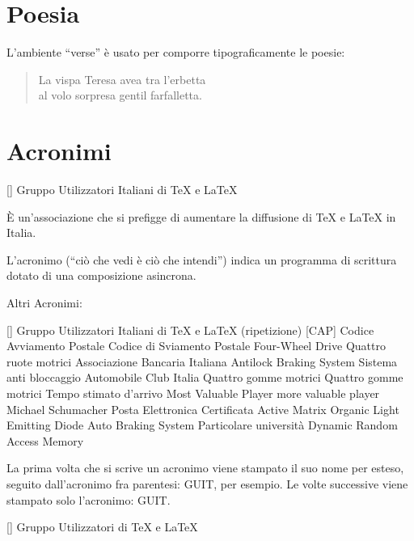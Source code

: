 \documentclass[a4paper,12pt]{article} %
\begin{document}
\section{Poesia} %
L'ambiente ``verse'' è usato per comporre tipograficamente le poesie:
\begin{verse}
	La vispa Teresa avea tra l'erbetta\\ %
	al volo sorpresa gentil farfalletta.
\end{verse}

\section{Acronimi}
\begin{acronym}   
	 [\GuIT] {Gruppo Utilizzatori Italiani di TeX e LaTeX}
	
	{\small È un’associazione che si prefigge di aumentare la diffusione di
		\TeX{} e \LaTeX{} in Italia.\par}
	{\small L’acronimo (“ciò che vedi è ciò che intendi”) indica un
		programma di scrittura dotato di una composizione asincrona.\par}
\end{acronym}
Altri Acronimi:
\begin{acronym}  
	 [\GuIT] {Gruppo Utilizzatori Italiani di TeX e LaTeX} (ripetizione)	
	 [CAP] {Codice Avviamento Postale}
	 {Codice di Sviamento Postale}
	 {Four-Wheel Drive} 
	 {Quattro ruote motrici} 
	 {Associazione Bancaria Italiana} 
	 {Antilock Braking System} 
	 {Sistema anti bloccaggio} 
	 {Automobile Club Italia} 
	 {Quattro gomme motrici} 
	 {Quattro gomme motrici} 
	 {Tempo stimato d'arrivo}
	 {Most Valuable Player}
	 {more valuable player}
	 {Michael Schumacher} %
	 {Posta Elettronica Certificata}
	 {Active Matrix Organic Light Emitting Diode}
	 {Auto Braking System}
	 {Particolare}
	 {università}
	 {Dynamic Random Access Memory}
\end{acronym}

La prima volta che si scrive un acronimo viene stampato il suo nome per esteso, seguito dall’acronimo fra parentesi: \ac{GUIT}, per esempio.
Le volte successive viene stampato solo l’acronimo: \ac{GUIT}.
\begin{acronym}  
	 [\GuIT] {Gruppo Utilizzatori di TeX e LaTeX} 	 
\end{acronym} 
\end{document}

